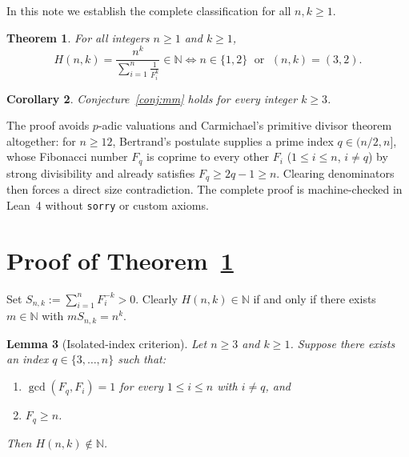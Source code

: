\documentclass[11pt,a4paper]{article}
\newtheorem{theorem}{Theorem}
\newtheorem{lemma}[theorem]{Lemma}
\newtheorem{corollary}[theorem]{Corollary}
\begin{document}
In this note we establish the complete classification for all $n,k \ge 1$.

\begin{theorem}\label{thm:main}
For all integers $n \ge 1$ and $k \ge 1$,
\[
H(n,k) = \frac{n^k}{\displaystyle\sum_{i=1}^n \frac{1}{F_i^k}} \in \mathbb{N}
\iff
n \in \{1,2\} \;\text{ or }\; (n,k) = (3,2).
\]
\end{theorem}

\begin{corollary}\label{cor:conj}
Conjecture~\ref{conj:mm} holds for every integer $k \ge 3$.
\end{corollary}

The proof avoids $p$-adic valuations and Carmichael's primitive divisor theorem altogether: for $n \ge 12$, Bertrand's postulate supplies a prime index $q \in (n/2, n]$, whose Fibonacci number $F_q$ is coprime to every other $F_i$ ($1 \le i \le n$, $i \ne q$) by strong divisibility and already satisfies $F_q \ge 2q - 1 \ge n$. Clearing denominators then forces a direct size contradiction. The complete proof is machine-checked in Lean~4 without \texttt{sorry} or custom axioms.

\section{Proof of Theorem~\ref{thm:main}}

Set $S_{n,k} := \sum_{i=1}^n F_i^{-k} > 0$. Clearly $H(n,k) \in \mathbb{N}$ if and only if there exists $m \in \mathbb{N}$ with $m S_{n,k} = n^k$.

\begin{lemma}[Isolated-index criterion]\label{lem:isolated}
Let $n \ge 3$ and $k \ge 1$. Suppose there exists an index $q \in \{3,\dots,n\}$ such that:
\begin{enumerate}
\item $\gcd(F_q, F_i) = 1$ for every $1 \le i \le n$ with $i \ne q$, and
\item $F_q \ge n$.
\end{enumerate}
Then $H(n,k) \notin \mathbb{N}$.
\end{lemma}
\end{document}
